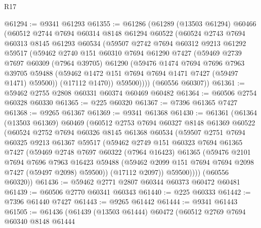 \begin{lexlean}{R17}
\begin{coremodule}
@61294 := @9341 @61293
@61355 := @61286
    (@61289
      (@13503 @61294)
      @60466
      (@60512
        @2744
        @7694
        @60314
        @8148
        @61294
        @60522
        (@60524
          @2743
          @7694
          @60313
          @8145
          @61293
          @60534
          (@59507
            @2742
            @7694
            @60312
            @9213
            @61292
            @59517
            (@59462
              @2740
              @151
              @60310
              @7694
              @61290
              @7427
              (@59469
                @2739
                @7697
                @60309
                (@7964 @39705)
                @61290
                (@59476
                  @1474
                  @7694
                  @7696
                  @7963
                  @39705
                  @59488
                  (@59462 @1472 @151 @7694 @7694 @1471 @7427 (@59497 @1471) @59500))
                (@17112 @1470))
              @59500))))
      (@60556 @60307))
@61361 := @59462 @2755 @2808 @60331 @60374 @60469 @60482
@61364 := @60506 @2754 @60328 @60330
@61365 := @225 @60320
@61367 := @7396 @61365 @7427
@61368 := @9265 @61367
@61369 := @9341 @61368
@61430 := @61361
    (@61364
      (@13503 @61369)
      @60469
      (@60512
        @2753
        @7694
        @60327
        @8148
        @61369
        @60522
        (@60524
          @2752
          @7694
          @60326
          @8145
          @61368
          @60534
          (@59507
            @2751
            @7694
            @60325
            @9213
            @61367
            @59517
            (@59462
              @2749
              @151
              @60323
              @7694
              @61365
              @7427
              (@59469
                @2748
                @7697
                @60322
                (@7964 @16423)
                @61365
                (@59476
                  @2101
                  @7694
                  @7696
                  @7963
                  @16423
                  @59488
                  (@59462 @2099 @151 @7694 @7694 @2098 @7427 (@59497 @2098) @59500))
                (@17112 @2097))
              @59500))))
      (@60556 @60320))
@61436 := @59462 @2771 @2807 @60344 @60373 @60472 @60481
@61439 := @60506 @2770 @60341 @60343
@61440 := @225 @60333
@61442 := @7396 @61440 @7427
@61443 := @9265 @61442
@61444 := @9341 @61443
@61505 := @61436
    (@61439
      (@13503 @61444)
      @60472
      (@60512
        @2769
        @7694
        @60340
        @8148
        @61444

\end{coremodule}
\end{lexlean}
